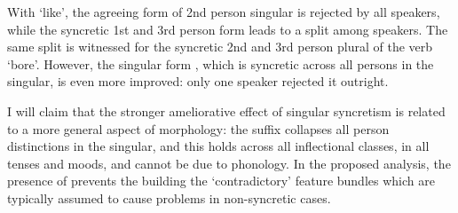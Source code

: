\documentclass[output=paper]{langscibook}
\begin{document}
With  `like', the agreeing form of 2nd person singular is rejected by all speakers, while the syncretic 1st and 3rd person form leads to a split among speakers. The same split is witnessed for the syncretic 2nd and 3rd person plural of the \sti verb  `bore'. However, the singular form , which is syncretic across all persons in the singular, is even more improved: only one speaker rejected it outright. 

I will claim that the stronger ameliorative effect of singular \sti syncretism is related to a more general aspect of \sti morphology: the \sti suffix collapses all person distinctions in the singular, and this holds across all inflectional classes, in all tenses and moods, and cannot be due to phonology. 
In the proposed analysis, the presence of \sti prevents the building the `contradictory' feature bundles which are typically assumed to cause problems in non-syncretic cases. 


 
\end{document}
